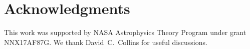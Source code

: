 \section*{Acknowledgments}

This work was supported by NASA Astrophysics Theory Program under grant NNX17AF87G.  We thank David~C.~Collins for useful discussions.  


